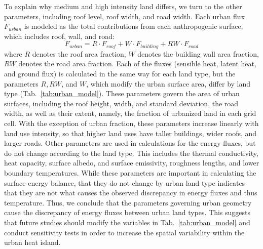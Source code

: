 \documentclass[draft,linenumbers]{agujournal}
\begin{document}
To explain why medium and high intensity land differs, we turn to the other parameters, including roof level, roof width, and road width. 
Each urban flux $F_{urban}$ is modeled as the total contributions from each anthropogenic surface, which includes roof, wall, and road: 
\[ F_{urban} = R\cdot F_{roof} + W\cdot F_{building} + RW\cdot F_{road} \]
where $R$ denotes the roof area fraction, $W$ denotes the building wall area fraction, $RW$ denotes the road area fraction.
Each of the fluxes (sensible heat, latent heat, and ground flux) is calculated in the same way for each land type, but the parameters $R, RW$, and $W$, which modify the urban surface area, differ by land type (Tab.~\ref{tab:urban_model}). 
These parameters govern the area of urban surfaces, including the roof height, width, and standard deviation, the road width, as well as their extent, namely, the fraction of urbanized land in each grid cell. 
With the exception of urban fraction, these parameters increase linearly with land use intensity, so that higher land uses have taller buildings, wider roofs, and larger roads. 
Other parameters are used in calculations for the energy fluxes, but do not change according to the land type. This includes the thermal conductivity, heat capacity, surface albedo, and surface emissivity, roughness lengths, and lower boundary temperatures. While these parameters are important in calculating the surface energy balance, that they do not change by urban land type indicates that they are not what causes the observed discrepancy in energy fluxes and thus temperature. 
Thus, we conclude that the parameters governing urban geometry cause the discrepancy of energy fluxes between urban land types. 
This suggests that future studies should modify the variables in Tab.~\ref{tab:urban_model} and conduct sensitivity tests in order to increase the spatial variability within the urban heat island.
 
\end{document}
